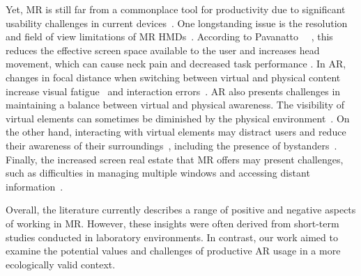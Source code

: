 Yet, MR is still far from a commonplace tool for productivity due to significant usability challenges in current devices~\cite{ens2014personalcockpit,mcgill2020seatedvrworkspace,medeiros2022shieldingar,ng2021passengerexperiencemrairplane,pavanatto2024multiplemonitors,pavanatto2021virtualmonitor}. 
One longstanding issue is the resolution and field of view limitations of MR HMDs~\cite{pavanatto2021virtualmonitor,biener2024xrworkpublic}.
According to Pavanatto~\etal~ \cite{pavanatto2021virtualmonitor}, this reduces the effective screen space available to the user and increases head movement, which can cause neck pain \cite{gruber2018officefuture,mcgill2020seatedvrworkspace} and decreased task performance \cite{pavanatto2023virtualmonitor,pavanatto2021virtualmonitor}.
In AR, changes in focal distance when switching between virtual and physical content increase visual fatigue~\cite{gabbard2019arcontextswitch}
and interaction errors~\cite{eiberger2019depth}. 
AR also presents challenges in maintaining a balance between virtual and physical awareness. 
The visibility of virtual elements can sometimes be diminished by the physical environment~\cite{cheng2021semanticadapt}. 
On the other hand, interacting with virtual elements may distract users and reduce their awareness of their surroundings~\cite{tao2022distractions,li2022mrworkspaces}, including the presence of bystanders~\cite{ohagen2020realityaware}.
Finally, 
the increased screen real estate that MR offers may present challenges, such as difficulties in managing multiple windows and accessing distant information~\cite{endert2012lhrd,pavanatto2024multiplemonitors,czerwinski2003largedisplays}.

Overall, the literature currently describes a range of positive and negative aspects of working in MR. However, these insights were often derived from short-term studies conducted in laboratory environments. 
In contrast, our work aimed to examine the potential values and challenges of productive AR usage in a more ecologically valid context.

